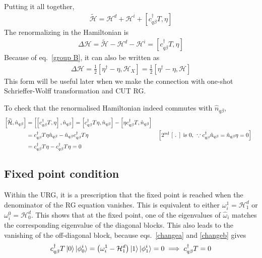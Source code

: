Putting it all together,
\begin{equation}\begin{aligned}
	\label{final2}
	\tilde{\mathcal{H}}= \mathcal{H}^d + \mathcal{H}^i + \left[c^\dagger_{q\beta} T, \eta\right]
\end{aligned}\end{equation}
The renormalizing in the Hamiltonian is
\begin{equation}\begin{aligned}
	\Delta \mathcal{H} = \tilde{\mathcal{H}}- \mathcal{H}^d - \mathcal{H}^i = \left[c^\dagger_{q\beta} T, \eta\right]
\end{aligned}\end{equation}
Because of eq.~\ref{group B}, it can also be written as
\begin{equation}\begin{aligned}
	\label{renurg}
	\Delta \mathcal{H} = \frac{1}{2}\left[\eta^\dagger - \eta,\mathcal{H}_X\right] = \frac{1}{2}\left[\eta^\dagger - \eta,\mathcal{H}\right]
\end{aligned}\end{equation}
This form will be useful later when we make the connection with one-shot Schrieffer-Wolff transformation and CUT RG.

To check that the renormalised Hamiltonian indeed commutes with \(\hat n_{q\beta}\),
\begin{equation}\begin{aligned}
	\left[\widetilde{\mathcal{H}}, \hat n_{q\beta}\right] &= \left[\left[c_{q\beta}^\dagger T,\eta\right],\hat n_{q\beta}\right] =\left[c_{q\beta}^\dagger T \eta,\hat n_{q\beta}\right] - \left[\eta c_{q\beta}^\dagger T,\hat n_{q\beta}\right]\\
                   &=c^\dagger_{q\beta} T \eta \hat n_{q\beta} - \hat n_{q\beta}c^\dagger_{q\beta} T \eta &&\left[\text{2\textsuperscript{nd} [ .
		   ] is 0, }\because c_{q\beta}^\dagger \hat n_{q\beta} = \hat n_{q\beta} \eta=0\right]\\
                   &=c_{q\beta}^\dagger T \eta - c_{q\beta}^\dagger T \eta =0
\end{aligned}\end{equation}
\subsection*{Fixed point condition}\label{match}
Within the URG, it is a prescription that the fixed point is reached when the denominator of the RG equation vanishes. This is equivalent to either \(\omega_i^1 = \mathcal{H}^d_1 \) or \(\omega_i^0 = \mathcal{H}^d_0 \).
This shows that at the fixed point, one of the eigenvalues of \(\hat \omega_i\) matches the corresponding eigenvalue of the diagonal blocks. This also leads to the vanishing of the off-diagonal block, because eqs.~\ref{changea} and \ref{changeb} gives
\begin{equation}\begin{aligned}
	c^\dagger_{q\beta}T\ket{0}\ket{\phi_0^i} = \left(\omega_i^1 - \mathcal{H}^d_1\right)\ket{1}\ket{\phi_1^i} = 0 \implies c^\dagger_{q\beta}T = 0
\end{aligned}\end{equation}
